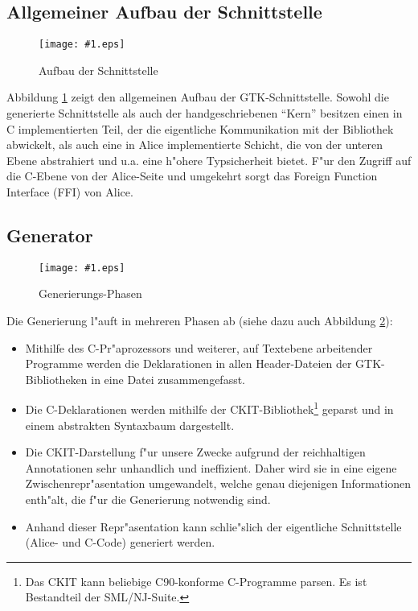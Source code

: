 \documentclass[a4paper,titlepage]{article}
\newcommand{\showimage}[1]{\begin{center}\texttt{[image: \#1.eps]}\end{center}}
\begin{document}
\subsection{Allgemeiner Aufbau der Schnittstelle}

\begin{figure}
\showimage{layout}
\caption{Aufbau der Schnittstelle}
\label{Layout}
\end{figure}
Abbildung \ref{Layout} zeigt den allgemeinen Aufbau der GTK-Schnittstelle.
Sowohl die generierte Schnittstelle als auch der handgeschriebenen ``Kern''
besitzen einen in C implementierten Teil, der die eigentliche Kommunikation
mit der Bibliothek abwickelt, als auch eine in Alice implementierte
Schicht, die von der unteren Ebene abstrahiert und u.a. eine h"ohere
Typsicherheit bietet. F"ur den Zugriff auf die C-Ebene von der Alice-Seite
und umgekehrt sorgt das Foreign Function Interface (FFI) von Alice.

\subsection{Generator}

\begin{figure}
\showimage{generator}
\caption{Generierungs-Phasen}
\label{Generator}
\end{figure}
Die Generierung l"auft in mehreren Phasen ab (siehe dazu auch
Abbildung \ref{Generator}):
\begin{itemize}
\item Mithilfe des C-Pr"aprozessors und weiterer, auf Textebene arbeitender
      Programme werden die Deklarationen in allen
      Header-Dateien der GTK-Bibliotheken in eine Datei zusammengefasst.
\item Die C-Deklarationen werden mithilfe der
      CKIT-Bibliothek\footnote{Das CKIT \cite{ckit} kann beliebige C90-konforme
      C-Programme parsen. Es ist Bestandteil der SML/NJ-Suite.}
      geparst und in einem abstrakten Syntaxbaum dargestellt.
\item Die CKIT-Darstellung f"ur unsere Zwecke aufgrund der reichhaltigen
      Annotationen sehr unhandlich und ineffizient. Daher wird sie in eine
      eigene Zwischenrepr"asentation umgewandelt, welche genau diejenigen
      Informationen enth"alt, die f"ur die Generierung notwendig sind.
\item Anhand dieser Repr"asentation kann schlie"slich der eigentliche
      Schnittstelle (Alice- und C-Code) generiert werden.
\end{itemize}
\end{document}
